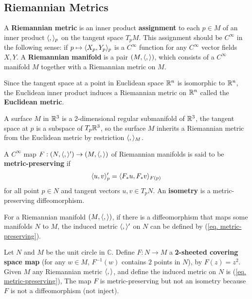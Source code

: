 \subsection{Riemannian Metrics}
\begin{definition}
    \label{def. Riemannian metric}
    A \textbf{Riemannian metric} is an inner product \textbf{assignment} 
    to each $p \in M$ of an inner product $\langle ,  \rangle_p$ on the tangent space $T_p M$.
    This assignment should be $C^\infty$ in the following sense: 
    if $p \mapsto \langle X_p, Y_p \rangle_p$ is a $C^\infty$ function for any $C^\infty$ 
    vector fields $X,Y$. A \textbf{Riemannian manifold} is a pair $(M, \langle ,  \rangle)$, 
    which consists of a $C^\infty$ manifold $M$ together with 
    a Riemannian metric on $M$.
\end{definition}
\begin{example}
    Since the tangent space at a point in Euclidean space ${\mathbb{R}}^n$ 
    is isomorphic to ${\mathbb{R}}^n$, the Euclidean inner product induces a Riemannian metric 
    on ${\mathbb{R}}^n$ called the \textbf{Euclidean metric}.
\end{example}
\begin{example}
    A surface $M$ in ${\mathbb{R}}^3$ is a $2$-dimensional regular submanifold of ${\mathbb{R}}^3$, 
    the tangent space at $p$ is a subspace of $T_p{\mathbb{R}}^3$, so the surface $M$ inherits 
    a Riemannian metric from the Euclidean metric by restriction $\langle ,  \rangle_M$.
\end{example}
\begin{definition}
    A $C^\infty$ map $F: (N, \langle ,  \rangle') \rightarrow (M, \langle ,  \rangle)$ of 
    Riemannian manifolds is said to be \textbf{metric-preserving} if 
    \begin{equation}
        \langle u, v \rangle'_p = \langle F_*u, F_*v \rangle_{F(p)}
        \label{eq. metric-preserving}
    \end{equation}
    for all point $p \in N$ and tangent vectors $u,v \in T_p N$. 
    An \textbf{isometry}
    is a metric-preserving diffeomorphism.
\end{definition}
For a Riemannian manifold $(M, \langle ,  \rangle)$, if there is a diffeomorphism that maps some
manifolds $N$ to $M$, the induced metric $\langle ,  \rangle'$ on $N$
 can be defined by (\ref{eq. metric-preserving}).
\begin{example}
    Let $N$ and $M$ be the unit circle in $\mathbb{C}$. 
    Define $F: N \rightarrow M$ a \textbf{2-sheeted covering space map} 
    (for any $w \in M$, $F^{-1}(w)$ contains $2$ points in $N$), 
    by $F(z)=z^2$. Given $M$
    any Riemannian metric $\langle ,  \rangle$, and define the induced metric 
    on $N$ is (\ref{eq. metric-preserving}),
    The map $F$ is metric-preserving 
    but not an isometry because $F$ is not a diffeomorphism (not inject).
\end{example}
\begin{example}
    
\end{example}

